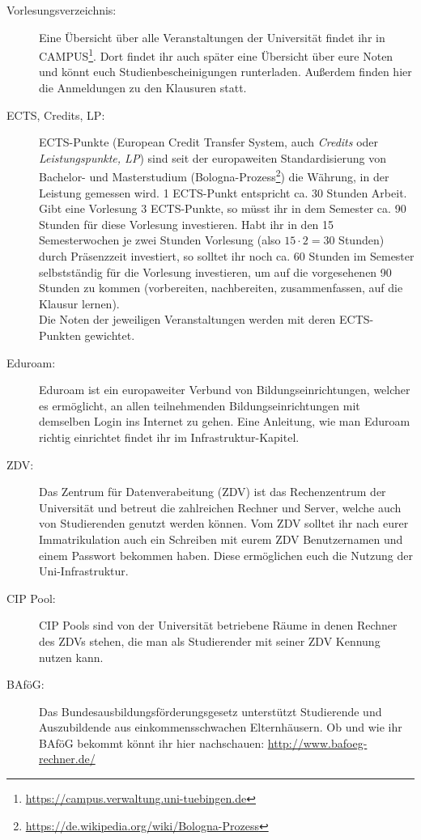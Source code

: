 \begin{description}
\item [Vorlesungsverzeichnis:] Eine Übersicht über alle Veranstaltungen der Universität findet ihr in CAMPUS\footnote{\url{https://campus.verwaltung.uni-tuebingen.de}}. Dort findet ihr auch später eine Übersicht über eure Noten und könnt euch Studienbescheinigungen runterladen. Außerdem finden hier die Anmeldungen zu den Klausuren statt.

\item [ECTS, Credits, LP:] ECTS-Punkte (European Credit Transfer System, auch \textit{Credits} oder \textit{Leistungspunkte, LP}) sind seit der europaweiten Standardisierung von Bachelor- und Masterstudium (Bologna-Prozess\footnote{\url{https://de.wikipedia.org/wiki/Bologna-Prozess}}) die Währung, in der Leistung gemessen wird. 1 ECTS-Punkt entspricht ca. 30 Stunden Arbeit. Gibt eine Vorlesung 3 ECTS-Punkte, so müsst ihr in dem Semester ca. 90 Stunden für diese Vorlesung investieren. Habt ihr in den 15 Semesterwochen je zwei Stunden Vorlesung (also $15\cdot 2=30$ Stunden) durch Präsenzzeit investiert, so solltet ihr noch ca. 60 Stunden im Semester selbstständig für die Vorlesung investieren, um auf die vorgesehenen 90 Stunden zu kommen (vorbereiten, nachbereiten, zusammenfassen, auf die Klausur lernen).\\
Die Noten der jeweiligen Veranstaltungen werden mit deren ECTS-Punkten gewichtet.
 
\item [Eduroam:] Eduroam ist ein europaweiter Verbund von Bildungseinrichtungen, welcher es ermöglicht, an allen teilnehmenden Bildungseinrichtungen mit demselben Login ins Internet zu gehen.
Eine Anleitung, wie man Eduroam richtig einrichtet findet ihr im Infrastruktur-Kapitel.

\item [ZDV:] Das Zentrum für Datenverabeitung (ZDV) ist das Rechenzentrum der Universität und betreut die zahlreichen Rechner und Server, welche auch von Studierenden genutzt werden können. Vom ZDV solltet ihr nach eurer Immatrikulation auch ein Schreiben mit eurem ZDV Benutzernamen und einem Passwort bekommen haben. Diese ermöglichen euch die Nutzung der Uni-Infrastruktur.

\item [CIP Pool:] CIP Pools sind von der Universität betriebene Räume in denen Rechner des ZDVs stehen, die man als Studierender mit seiner ZDV Kennung nutzen kann.

\item[BAföG:] Das Bundesausbildungsförderungsgesetz unterstützt Studierende und Auszubildende aus einkommensschwachen Elternhäusern. Ob und wie ihr BAföG bekommt könnt ihr hier nachschauen: \url{http://www.bafoeg-rechner.de/}


\end{description}
